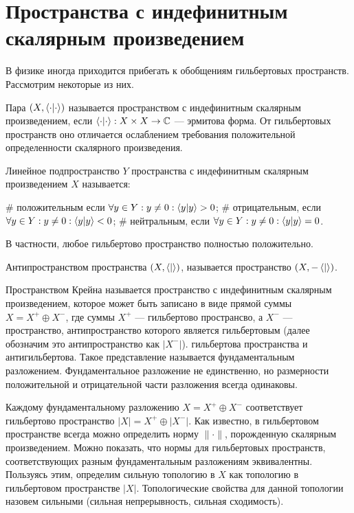 

\section{Пространства с индефинитным скалярным произведением}
В физике иногда приходится прибегать к обобщениям гильбертовых пространств. Рассмотрим некоторые из них.


Пара $(X, \ipcdot)$ называется пространством с индефинитным скалярным произведением, если $\ipcdot: X \times X \to \bbC$ — эрмитова форма. От гильбертовых пространств оно отличается ослаблением требования положительной определенности скалярного произведения.

Линейное подпространство $Y$ пространства с индефинитным скалярным произведением $X$ называется:
\begin{ilist}
# положительным если $\forall y \in Y: y \ne 0: \ip{y}{y} > 0$;
# отрицательным, если $\forall y \in Y: y \ne 0: \ip{y}{y} < 0$;
# нейтральным, если $\forall y \in Y: y \ne 0: \ip{y}{y} = 0$.
\end{ilist}
В частности, любое гильбертово пространство полностью положительно.

Антипространством пространства $(X, \ip{}{})$, называется пространство $(X, -\ip{}{})$.

Пространством Крейна называется пространство с индефинитным скалярным произведением, которое может быть записано в виде прямой суммы $X = X^+ \oplus X^-$, где суммы $X^+$ — гильбертово пространсво, а $X^-$ — пространство, антипространство которого является гильбертовым (далее обозначим это антипространство как $|X^-|$). гильбертова пространства и антигильбертова. Такое представление называется фундаментальным разложением. Фундаментальное разложение не единственно, но размерности положительной и отрицательной части разложения всегда одинаковы.

Каждому фундаментальному разложению $X = X^+ \oplus X^-$ соответствует гильбертово пространство $|X| = X^+ \oplus |X^-|$. Как известно, в гильбертовом пространстве всегда можно определить норму $\| \cdot \|$, порожденную скалярным произведением. Можно показать, что нормы для гильбертовых пространств, соответствующих разным фундаментальным разложениям эквивалентны. Пользуясь этим, определим сильную топологию в $X$ как топологию в гильбертовом пространстве $|X|$. Топологические свойства для данной топологии назовем сильными (сильная непрерывность, сильная сходимость).

